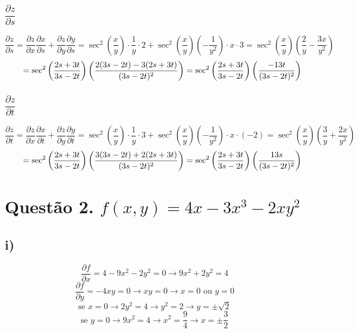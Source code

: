 \documentclass[12pt]{article}
\begin{document}
\subsubsection{$\dfrac{\partial z}{\partial s}$}

\[\dfrac{\partial z}{\partial s} = \dfrac{\partial z}{\partial x} \dfrac{\partial x}{\partial s} + \dfrac{\partial z}{\partial y} \dfrac{\partial y}{\partial s} = \sec^{2} \left( \dfrac{x}{y} \right) \cdot \dfrac{1}{y}\cdot 2 + \sec^{2} \left( \dfrac{x}{y} \right) \left( -\dfrac{1}{y^{2}} \right) \cdot x \cdot 3 = \sec^{2} \left( \dfrac{x}{y} \right) \left(\dfrac{2}{y} -\dfrac{3x}{y^{2}}\right)\]
\[\hspace{+19pt} = \sec^{2} \left( \dfrac{2s+3t}{3s-2t} \right) \left(\dfrac{2(3s-2t)-3(2s+3t)}{(3s-2t)^{2}}\right) = \sec^{2} \left( \dfrac{2s+3t}{3s-2t} \right) \left(\dfrac{-13t}{(3s-2t)^{2}}\right)\]

\subsubsection{$\dfrac{\partial z}{\partial t}$}

\[\dfrac{\partial z}{\partial t} = \dfrac{\partial z}{\partial x} \dfrac{\partial x}{\partial t} + \dfrac{\partial z}{\partial y} \dfrac{\partial y}{\partial t} = \sec^{2} \left( \dfrac{x}{y} \right) \cdot \dfrac{1}{y}\cdot 3 + \sec^{2} \left( \dfrac{x}{y} \right) \left( -\dfrac{1}{y^{2}} \right) \cdot x \cdot (-2) = \sec^{2} \left( \dfrac{x}{y} \right) \left(\dfrac{3}{y} +\dfrac{2x}{y^{2}}\right)\]
\[\hspace{+19pt} = \sec^{2} \left( \dfrac{2s+3t}{3s-2t} \right) \left(\dfrac{3(3s-2t)+2(2s+3t)}{(3s-2t)^{2}}\right) = \sec^{2} \left( \dfrac{2s+3t}{3s-2t} \right) \left(\dfrac{13s}{(3s-2t)^{2}}\right)\]

\section{Questão 2. $f(x,y) = 4x-3x^{3}-2xy^{2}$}
\subsection{i)}

\[\dfrac{\partial f}{\partial x} = 4-9x^{2}-2y^{2} = 0 \longrightarrow 9x^{2}+2y^{2}=4\]
\[\dfrac{\partial f}{\partial y} = -4xy = 0 \longrightarrow xy = 0 \longrightarrow x=0 \text{ ou } y=0\]
\[\text{se } x=0 \longrightarrow 2y^{2}=4 \longrightarrow y^{2}=2 \longrightarrow y = \pm \sqrt{2} \]
\[\text{se } y=0 \longrightarrow 9x^{2}=4 \longrightarrow x^{2}=\dfrac{9}{4} \longrightarrow x = \pm \dfrac{3}{2}\]
\end{document}
